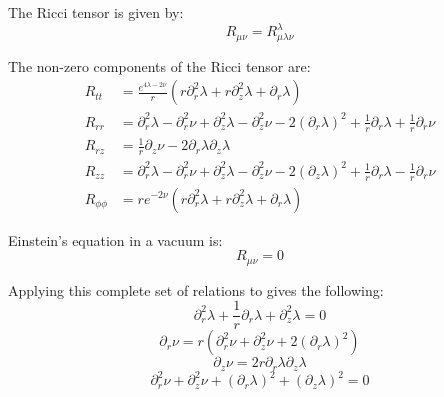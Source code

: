 \documentclass{article}
\begin{document}
The Ricci tensor is given by:
\begin{equation}
R_{\mu\nu}=R_{\mu\lambda\nu}^{\lambda}
\end{equation}

The non-zero components of the Ricci tensor are:
\begin{equation}
\begin{aligned}
R_{tt}&=\frac{e^{4\lambda-2\nu}}{r}\left(r\partial^{2}_{r}\lambda+r\partial^{2}_{z}\lambda+\partial_{r}\lambda\right)\\
R_{rr}&=\partial^{2}_{r}\lambda-\partial^{2}_{r}\nu+\partial^{2}_{z}\lambda-\partial^{2}_{z}\nu-2\left(\partial_{r}\lambda\right)^{2}+\frac{1}{r}\partial_{r}\lambda+\frac{1}{r}\partial_{r}\nu\\
R_{rz}&=\frac{1}{r}\partial_{z}\nu-2\partial_{r}\lambda\partial_{z}\lambda\\
R_{zz}&=\partial^{2}_{r}\lambda-\partial^{2}_{r}\nu+\partial^{2}_{z}\lambda-\partial^{2}_{z}\nu-2\left(\partial_{z}\lambda\right)^{2}+\frac{1}{r}\partial_{r}\lambda-\frac{1}{r}\partial_{r}\nu\\
R_{\phi\phi}&=re^{-2\nu}\left(r\partial^{2}_{r}\lambda+r\partial^{2}_{z}\lambda+\partial_{r}\lambda\right)
\end{aligned}
\label{eq:ricci-tensor-components}
\end{equation}

Einstein's equation in a vacuum is:
\begin{equation}
R_{\mu\nu}=0\label{eq:vacuum-solutions}
\end{equation}

Applying this complete set of relations to  gives the following:
\begin{equation}
\partial^{2}_{r}\lambda+\frac{1}{r}\partial_{r}\lambda+\partial^{2}_{z}\lambda=0\label{eq:laplace}
\end{equation}
\begin{equation}
\partial_{r}\nu=r\left(\partial^{2}_{r}\nu+\partial^{2}_{z}\nu+2\left(\partial_{r}\lambda\right)^{2}\right)\label{eq:R_rr=0}
\end{equation}
\begin{equation}
\partial_{z}\nu=2r\partial_{r}\lambda\partial_{z}\lambda\label{eq:nu_z}
\end{equation}
\begin{equation}
\partial^{2}_{r}\nu+\partial^{2}_{z}\nu+\left(\partial_{r}\lambda\right)^{2}+\left(\partial_{z}\lambda\right)^{2}=0\label{eq:R_phiphi=0}
\end{equation}
\end{document}
